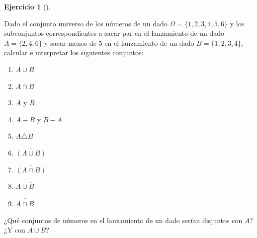 \documentclass[
  spanish,
  a4paper,
]{scrreport}
\providecommand{\tightlist}{%
  \setlength{\itemsep}{0pt}\setlength{\parskip}{0pt}}
\theoremstyle{definition}
\newtheorem{exercise}{Ejercicio}[chapter]
\theoremstyle{remark}
\begin{document}
\begin{exercise}[]\protect\hypertarget{exr-operaciones-conjuntos}{}\label{exr-operaciones-conjuntos}

Dado el conjunto universo de los números de un dado
\(\Omega=\{1, 2, 3, 4, 5, 6\}\) y los subconjuntos correspondientes a
sacar par en el lanzamiento de un dado \(A=\{2, 4, 6\}\) y sacar menos
de 5 en el lanzamiento de un dado \(B=\{1, 2, 3, 4\}\), calcular e
interpretar los siguientes conjuntos:

\begin{enumerate}
\def\labelenumi{\alph{enumi}.}
\tightlist
\item
  \(A\cup B\)
\item
  \(A\cap B\)
\item
  \(\overline A\) y \(\overline B\)
\item
  \(A-B\) y \(B-A\)
\item
  \(A\triangle B\)
\item
  \(\overline{(A\cup B)}\)
\item
  \(\overline{(A\cap B)}\)
\item
  \(A\cup \overline B\)
\item
  \(\overline{\overline A \cap B}\)
\end{enumerate}

¿Qué conjuntos de números en el lanzamiento de un dado serían disjuntos
con \(A\)? ¿Y con \(A\cup B\)?

\end{exercise}
\end{document}
